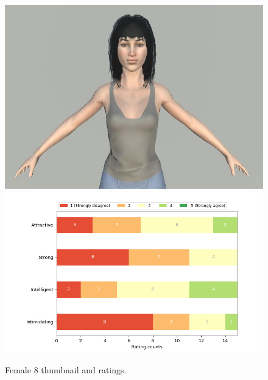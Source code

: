\begin{figure}[H]
  \includegraphics[width=\linewidth]{Images/Females/8.JPG}
\endminipage\hfill
{}
  \includegraphics[width=\linewidth]{Survey/FRatings/avatar_f8.png}
\endminipage\hfill
\caption{Female 8 thumbnail and ratings.}
\end{figure}



